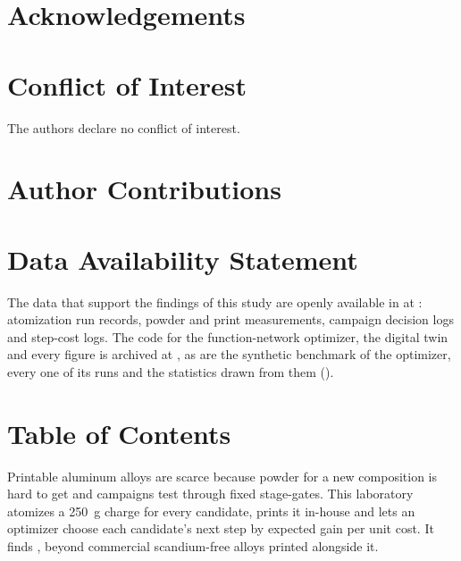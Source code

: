 \documentclass[11pt]{article}
\begin{document}
\section*{Acknowledgements}

\section*{Conflict of Interest}
The authors declare no conflict of interest. 

\section*{Author Contributions}

\section*{Data Availability Statement}
The data that support the findings of this study are openly available in
 at : atomization run records, powder and print
measurements, campaign decision logs and step-cost logs. The code for the
function-network optimizer, the digital twin and every figure is archived at
, as are the synthetic benchmark of the optimizer, every one
of its runs and the statistics drawn from them ().

\printbibliography

\clearpage
\section*{Table of Contents}
Printable aluminum alloys are scarce because powder for a new composition is hard
to get and campaigns test through fixed stage-gates. This laboratory atomizes a
\SI{250}{\gram} charge for every candidate, prints it in-house and lets an
optimizer choose each candidate's next step by expected gain per unit cost. It
finds , beyond commercial scandium-free alloys printed alongside it.
\end{document}
